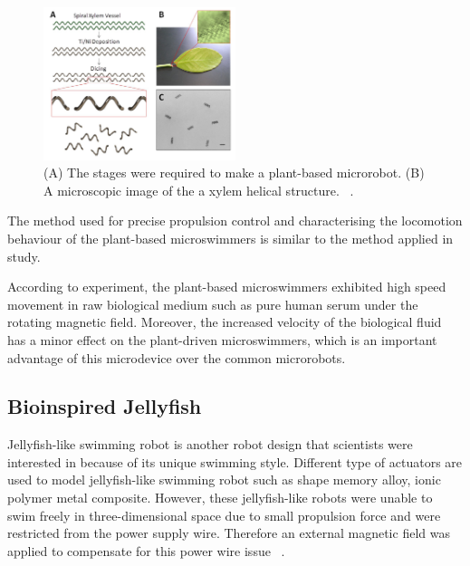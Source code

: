 \documentclass[a4paper,11pt]{article}
\begin{document}
\begin{sloppypar}
\begin{figure}
  \begin{center}
    \includegraphics[width=0.5\textwidth]{plants2}
  \caption{(A) The stages were required to make a plant-based microrobot. (B) A microscopic image of the 
a xylem helical structure. ~\citep{gao2013bioinspired}.}
  \label{plants2}
\end{center}
\end{figure}

The method used for precise propulsion control and characterising the locomotion behaviour of the 
plant-based microswimmers is similar to the method applied in \citeauthor{gao2013bioinspired} study.

According to \citeauthor{gao2013bioinspired} experiment, the plant-based 
microswimmers exhibited high speed movement in raw biological medium such as 
pure human serum under the rotating magnetic field. Moreover, the increased velocity of the 
biological fluid has a minor effect on the plant-driven microswimmers, which is an important 
advantage of this microdevice over the common microrobots.



\subsection{Bioinspired Jellyfish}
Jellyfish-like swimming robot is another robot design that scientists were interested 
in because of its unique swimming style. Different type of actuators are used to model
 jellyfish-like swimming robot such as shape memory alloy, ionic polymer metal 
composite. However, these jellyfish-like robots were unable to swim freely in 
three-dimensional space due to small propulsion force and were restricted from
 the power supply wire. Therefore an external magnetic field was applied to compensate 
for this power wire issue ~\citep{ko2012jellyfish}.


\end{sloppypar}
\end{document}
